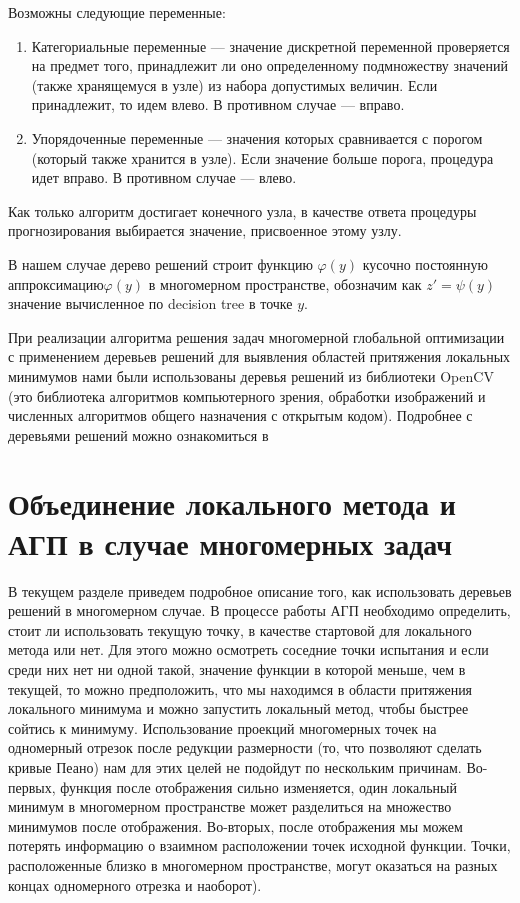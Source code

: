 \documentclass[12pt, a4paper, russian]{article}
\begin{document}
Возможны следующие переменные:
\begin{enumerate}

\item Категориальные переменные --- значение дискретной переменной проверяется на предмет того, принадлежит ли оно определенному подмножеству значений (также хранящемуся в узле) из набора допустимых величин. Если принадлежит, то идем влево. В противном случае --- вправо. 

\item Упорядоченные переменные --- значения которых сравнивается с порогом (который также хранится в узле). Если значение больше порога, процедура идет вправо. В противном случае --- влево.
\end{enumerate}

Как только алгоритм достигает конечного узла, в качестве ответа процедуры прогнозирования выбирается значение, присвоенное этому узлу. 

В нашем случае дерево решений строит функцию $\varphi(y)$ кусочно постоянную аппроксимацию$\varphi(y)$  в многомерном пространстве, обозначим как $z' = \psi(y)$ значение вычисленное по decision tree в точке $y$.

При реализации алгоритма  решения задач многомерной глобальной оптимизации с применением деревьев решений для выявления областей притяжения локальных минимумов нами были использованы  деревья решений из библиотеки OpenCV (это библиотека алгоритмов компьютерного зрения, обработки изображений и численных алгоритмов общего назначения с открытым кодом). Подробнее с  деревьями решений можно ознакомиться в \cite{fio_bib16}


\section{Объединение локального метода и АГП в случае многомерных задач}

В текущем разделе приведем подробное описание того, как использовать деревьев решений в многомерном случае. В процессе работы АГП необходимо определить, стоит ли использовать текущую точку, в качестве стартовой для локального метода или нет. Для этого можно осмотреть соседние точки испытания и если среди них нет ни одной такой, значение функции в которой меньше, чем в текущей, то можно предположить, что мы находимся в области притяжения локального минимума и можно запустить локальный метод, чтобы быстрее сойтись к минимуму. Использование проекций многомерных точек на одномерный отрезок после редукции размерности (то, что позволяют сделать кривые Пеано) нам для этих целей не подойдут по нескольким причинам. Во-первых, функция после отображения сильно изменяется, один локальный минимум в многомерном пространстве может разделиться на множество минимумов после отображения. Во-вторых, после отображения мы можем потерять информацию о взаимном расположении точек исходной функции. Точки, расположенные близко в многомерном пространстве, могут оказаться на разных концах одномерного отрезка и наоборот).
\end{document}
